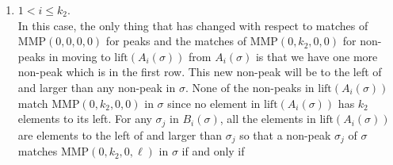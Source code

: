 \documentclass[
final,nomarks
]{dmtcs-episciences}
\newcommand{\lift}{\mathrm{lift}}
\newcommand{\MMP}{\mathrm{MMP}}
\begin{document}
\begin{enumerate}[{\bf Case }\bf 1.]
	\item \begin{math}1 < i \leq k_2\end{math}.\\
	In this case, the only thing that has changed with respect to matches of \begin{math}\MMP(0,0,0,0)\end{math} 
	for peaks and the matches of \begin{math}\MMP(0,k_2,0,0)\end{math} for non-peaks in moving  
	to \begin{math}\mathrm{lift}(A_i(\sigma))\end{math} from \begin{math}A_i(\sigma)\end{math} is that we have one more non-peak 
	which is in the first row. This new non-peak will be to the left of and larger than 
	any non-peak in \begin{math}\sigma\end{math}. None of the non-peaks in \begin{math}\lift(A_i(\sigma))\end{math} 
	match \begin{math}\MMP(0,k_2,0,0)\end{math} in \begin{math}\sigma\end{math} since no element in \begin{math}\lift(A_i(\sigma))\end{math} has \begin{math}k_2\end{math} elements 
	to its left. For  any \begin{math}\sigma_j\end{math} in \begin{math}B_i(\sigma)\end{math}, all the elements in 
	\begin{math}\mathrm{lift}(A_i(\sigma))\end{math} are elements to 
	the left of and larger than \begin{math}\sigma_j\end{math} so 
	that a non-peak \begin{math}\sigma_j\end{math} of \begin{math}\sigma\end{math} matches  \begin{math}\MMP(0,k_2,0,\ell)\end{math} in \begin{math}\sigma\end{math} if and only if 

\end{enumerate}
\end{document}
